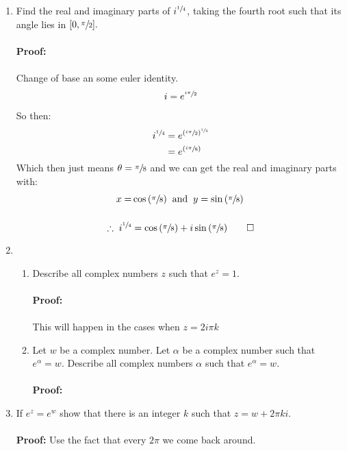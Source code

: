 \begin{enumerate}
	
	\item Find the real and imaginary parts of $i^{\sfrac{1}{4}}$, taking the fourth root such that its angle lies in $[0, \sfrac{\pi}{2}].$ \\
	\\
	\textbf{Proof:} \\
	\\
	Change of base an some euler identity. \\
	\begin{align*}
		i &= e^{\sfrac{i\pi}{2}} \\
	\end{align*}
	So then:
	\begin{align*}
		i^{\sfrac{1}{4}} &= e^{(\sfrac{i \pi}{2})^{\sfrac{1}{4}}} \\
		&= e^{(\sfrac{i \pi}{8})}
	\end{align*}
	Which then just means $\theta = \sfrac{\pi}{8}$ and we can get the real and imaginary parts with:
	\begin{align*}
		x = &\cos{(\sfrac{\pi}{8})} \;\; \text{and} \;\; y = \sin{(\sfrac{\pi}{8})} \\
		\\
		\therefore \; i^{\sfrac{1}{4}} &= \cos{(\sfrac{\pi}{8})} + i\sin{(\sfrac{\pi}{8})} \qed
	\end{align*}
	

	\item
	\begin{enumerate}
		\item Describe all complex numbers $z$ such that $e^z = 1.$ \\
		\\
		\textbf{Proof:} \\
		\\
		This will happen in the cases when $ z = 2 i \pi k$ \\


		\item Let $w$ be a complex number. Let $\alpha$ be a complex number such that $e^{\alpha} = w.$ Describe all complex numbers $\alpha$ such that $e^\alpha = w.$ \\
		\\
		\textbf{Proof:}
	\end{enumerate} 


	\item If $e^z = e^w$ show that there is an integer $k$ such that $z = w + 2\pi k i.$ \\
	\\
	\textbf{Proof:} Use the fact that every $2\pi$ we come back around.
	


\end{enumerate}
